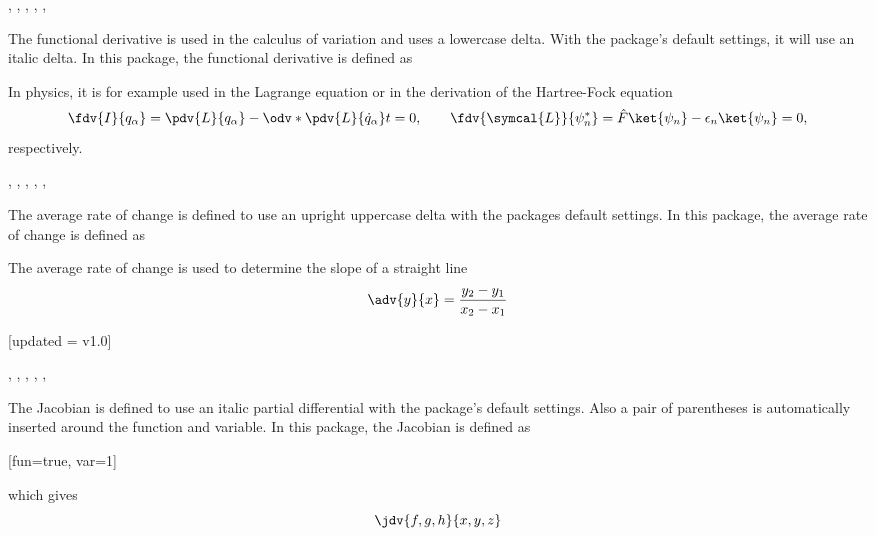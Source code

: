 \begin{function}{\fdv}
	\begin{syntax}
		\sarg, , , \targ{/}, , 
	\end{syntax}
	The functional derivative is used in the calculus of variation and uses a lowercase delta. With the package's default settings, it will use an italic delta. In this package, the functional derivative is defined as
	
	\begin{definition}
		\DeclareDerivative{\fdv}{\delta}
	\end{definition}
	
	\noindent In physics, it is for example used in the Lagrange equation or in the derivation of the Hartree-Fock equation
	\begin{equation*}
		\fdv{I}{q_{\alpha}} = \pdv{L}{q_{\alpha}} - \odv*{ \pdv{L}{ \dot{q}_{\alpha} } } { t } = 0, \qquad \fdv{ \symcal{L} }{ \psi_{n}^* } = \hat{F} \ket{\psi_{n}} - \epsilon_{n} \ket{\psi_{n}} = 0
		,
	\end{equation*}
	respectively.
\end{function}

\begin{function}{\adv}
	\begin{syntax}
		\sarg, , , \targ{/}, , \earg{\_, point\tsb{1}, \^, point\tsb{2}}
	\end{syntax}
	The average rate of change is defined to use an upright uppercase delta with the packages default settings. In this package, the average rate of change is defined as
	
	\begin{definition}
		\DeclareDerivative{\adv}{\Delta}
	\end{definition}
	
	\noindent The average rate of change is used to determine the slope of a straight line
	\begin{equation*}
		\adv{ y }{ x } = \frac{y_2- y_1}{x_2 - x_1}
	\end{equation*}
\end{function}

\begin{function}{\jdv}[updated = v1.0]
	\begin{syntax}
		\sarg, , , \targ{/}, , 
	\end{syntax}
	The Jacobian is defined to use an italic partial differential with the package's default settings. Also a pair of parentheses is automatically inserted around the function and variable. In this package, the Jacobian is defined as
		
	\begin{definition}
		\DeclareDerivative{\jdv}{\partial}[fun=true, var=1]
	\end{definition}
	
	\noindent which gives
	\begin{equation*}
		\jdv{f,g,h}{x,y,z}
	\end{equation*}
\end{function}

